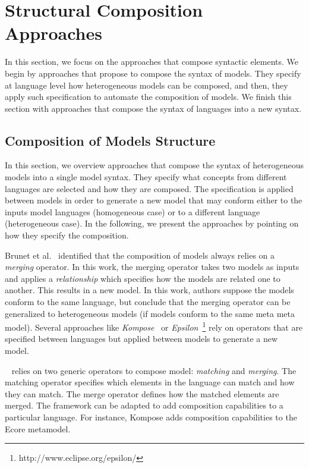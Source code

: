 \section{Structural Composition Approaches}
In this section, we focus on the approaches that compose syntactic elements. We begin by approaches that propose to compose the syntax of models. They specify at language level how heterogeneous models can be composed, and then, they apply such specification to automate the composition of models. We finish this section with approaches that compose the syntax of languages into a new syntax. 

 	
 \subsection{Composition of Models Structure}

In this section, we overview approaches that compose the syntax of heterogeneous models into a single model syntax. They specify what concepts from different languages are selected and how they are composed. The specification is applied between models in order to generate a new model that may conform either to the inputs model languages (homogeneous case) or to a different language (heterogeneous case). In the following, we present the approaches by pointing on how they specify the composition.   

Brunet et al.~\cite{mergemanifest} identified that the composition of models always relies on a \emph{merging} operator. In this work, the merging operator takes two models as inputs and applies a \emph{relationship} which specifies how the models are related one to another. This results in a new model. In this work, authors suppose the models conform to the same language, but conclude that the merging operator can be generalized to heterogeneous models (if models conform to the same meta meta model). Several approaches like \emph{Kompose}~\cite{kompose} or \emph{Epsilon}~\cite{epsilon}\footnote{http://www.eclipse.org/epsilon/} rely on operators that are specified between languages but applied between models to generate a new model. 
    		
~\cite{kompose} relies on two generic operators to compose model: \emph{matching} and \emph{merging}. The matching operator specifies which elements in the language can match and how they can match. The merge operator defines how the matched elements are merged. The framework can be adapted to add composition capabilities to a particular language. For instance, Kompose adds composition capabilities to the Ecore metamodel. 
    		
